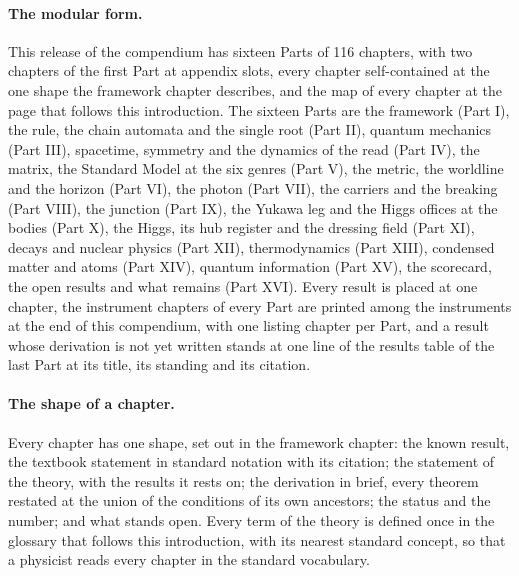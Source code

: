 \paragraph{The modular form.} This release of the compendium has sixteen Parts of 116 chapters, with two chapters of the first Part at appendix slots, every chapter self-contained at the one shape the framework chapter describes, and the map of every chapter at the page that follows this introduction. The sixteen Parts are the framework (Part I), the rule, the chain automata and the single root (Part II), quantum mechanics (Part III), spacetime, symmetry and the dynamics of the read (Part IV), the matrix, the Standard Model at the six genres (Part V), the metric, the worldline and the horizon (Part VI), the photon (Part VII), the carriers and the breaking (Part VIII), the junction (Part IX), the Yukawa leg and the Higgs offices at the bodies (Part X), the Higgs, its hub register and the dressing field (Part XI), decays and nuclear physics (Part XII), thermodynamics (Part XIII), condensed matter and atoms (Part XIV), quantum information (Part XV), the scorecard, the open results and what remains (Part XVI). Every result is placed at one chapter, the instrument chapters of every Part are printed among the instruments at the end of this compendium, with one listing chapter per Part, and a result whose derivation is not yet written stands at one line of the results table of the last Part at its title, its standing and its citation.

\paragraph{The shape of a chapter.} Every chapter has one shape, set out in the framework chapter: the known result, the textbook statement in standard notation with its citation; the statement of the theory, with the results it rests on; the derivation in brief, every theorem restated at the union of the conditions of its own ancestors; the status and the number; and what stands open. Every term of the theory is defined once in the glossary that follows this introduction, with its nearest standard concept, so that a physicist reads every chapter in the standard vocabulary.

